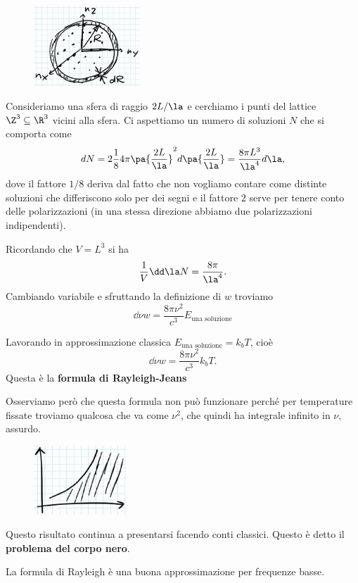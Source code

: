 \begin{figure}[!htb]
    \centering
    \includegraphics[width=4cm]{images/guscio_sferico.png}
\end{figure}

\noindent
Consideriamo una sfera di raggio $2L/\la$ e cerchiamo i punti del lattice $\Z^3\subseteq \R^3$ vicini alla sfera. Ci aspettiamo un numero di soluzioni $N$ che si comporta come
\[dN=2\frac18 4\pi \pa{\frac{2L}\la}^2 d\pa{\frac{2L}\la}=\frac{8\pi L^3}{\la^4}d\la,\] 
dove il fattore $1/8$ deriva dal fatto che non vogliamo contare come distinte soluzioni che differiscono solo per dei segni e il fattore $2$ serve per tenere conto delle polarizzazioni (in una stessa direzione abbiamo due polarizzazioni indipendenti).\bigskip

\noindent
Ricordando che $V=L^3$ si ha
\[\frac1V\dd \la N=\frac{8\pi}{\la^4}.\]
Cambiando variabile e sfruttando la definizione di $w$ troviamo
\[\boxed{\dd \nu w=\frac{8\pi \nu^2}{c^3}E_{\text{una soluzione}}}\]
\bigskip

\noindent
Lavorando in approssimazione classica $E_{\text{una soluzione}}=k_bT$, cio\`e
\[\dd \nu w=\frac{8\pi \nu^2}{c^3}k_b T.\]
Questa \`e la \textbf{formula di Rayleigh-Jeans}\bigskip

\noindent
Osserviamo per\`o che questa formula non pu\`o funzionare perch\'e per temperature fissate troviamo qualcosa che va come $\nu^2$, che quindi ha integrale infinito in $\nu$, assurdo.

\begin{figure}[!htb]
    \centering
    \includegraphics[width=3.5cm]{images/divergenza_problema_corpo_nero}
\end{figure}


\noindent
Questo risultato continua a presentarsi facendo conti classici. Questo \`e detto il \textbf{problema del corpo nero}.

\begin{remark}
La formula di Rayleigh \`e una buona approssimazione per frequenze basse.
\end{remark}


